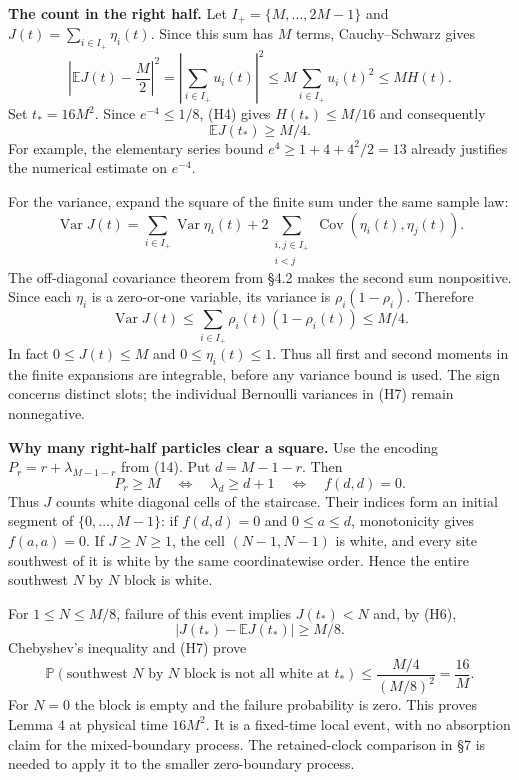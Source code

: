 \documentclass[
  11pt,
  a4paper,
]{article}
\begin{document}
\textbf{The count in the right half.} Let \(I_+=\{M,\ldots,2M-1\}\) and
\(J(t)=\sum_{i\in I_+}\eta_i(t)\). Since this sum has \(M\) terms,
Cauchy--Schwarz gives \[
\left|\mathbb E J(t)-\frac M2\right|^2
=\left|\sum_{i\in I_+}u_i(t)\right|^2
\leq M\sum_{i\in I_+}u_i(t)^2\leq MH(t).
\tag{H5}
\] Set \(t_*=16M^2\). Since \(e^{-4}\leq1/8\), (H4) gives
\(H(t_*)\leq M/16\) and consequently \[
\mathbb E J(t_*)\geq M/4.
\tag{H6}
\] For example, the elementary series bound \(e^4\geq1+4+4^2/2=13\)
already justifies the numerical estimate on \(e^{-4}\).

For the variance, expand the square of the finite sum under the same
sample law: \[
\operatorname{Var}J(t)
=\sum_{i\in I_+}\operatorname{Var}\eta_i(t)
+2\sum_{\substack{i,j\in I_+\\i<j}}\operatorname{Cov}(\eta_i(t),\eta_j(t)).
\] The off-diagonal covariance theorem from §4.2 makes the second sum
nonpositive. Since each \(\eta_i\) is a zero-or-one variable, its
variance is \(\rho_i(1-\rho_i)\). Therefore \[
\operatorname{Var}J(t)\leq\sum_{i\in I_+}\rho_i(t)(1-\rho_i(t))\leq M/4.
\tag{H7}
\] In fact \(0\leq J(t)\leq M\) and \(0\leq\eta_i(t)\leq1\). Thus all
first and second moments in the finite expansions are integrable, before
any variance bound is used. The sign concerns distinct slots; the
individual Bernoulli variances in (H7) remain nonnegative.

\textbf{Why many right-half particles clear a square.} Use the encoding
\(P_r=r+\lambda_{M-1-r}\) from (14). Put \(d=M-1-r\). Then \[
P_r\geq M\quad\Longleftrightarrow\quad\lambda_d\geq d+1
\quad\Longleftrightarrow\quad f(d,d)=0.
\tag{H8}
\] Thus \(J\) counts white diagonal cells of the staircase. Their
indices form an initial segment of \(\{0,\ldots,M-1\}\): if \(f(d,d)=0\)
and \(0\leq a\leq d\), monotonicity gives \(f(a,a)=0\). If
\(J\geq N\geq1\), the cell \((N-1,N-1)\) is white, and every site
southwest of it is white by the same coordinatewise order. Hence the
entire southwest \(N\) by \(N\) block is white.

For \(1\leq N\leq M/8\), failure of this event implies \(J(t_*)<N\) and,
by (H6), \[
|J(t_*)-\mathbb E J(t_*)|\geq M/8.
\] Chebyshev's inequality and (H7) prove \[
\mathbb P(\text{southwest }N\text{ by }N\text{ block is not all white at }t_*)
\leq\frac{M/4}{(M/8)^2}=\frac{16}{M}.
\tag{H9}
\] For \(N=0\) the block is empty and the failure probability is zero.
This proves Lemma 4 at physical time \(16M^2\). It is a fixed-time local
event, with no absorption claim for the mixed-boundary process. The
retained-clock comparison in §7 is needed to apply it to the smaller
zero-boundary process.
\end{document}

